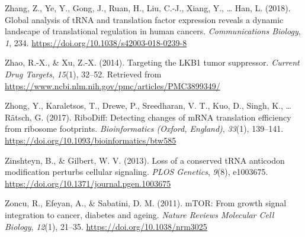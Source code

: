 \documentclass[12pt,openany]{book}
\begin{document}
\hypertarget{ref-Zhang2018}{}
Zhang, Z., Ye, Y., Gong, J., Ruan, H., Liu, C.-J., Xiang, Y., \ldots{}
Han, L. (2018). Global analysis of tRNA and translation factor
expression reveals a dynamic landscape of translational regulation in
human cancers. \emph{Communications Biology}, \emph{1}, 234.
\url{https://doi.org/10.1038/s42003-018-0239-8}

\hypertarget{ref-Zhao2014}{}
Zhao, R.-X., \& Xu, Z.-X. (2014). Targeting the LKB1 tumor suppressor.
\emph{Current Drug Targets}, \emph{15}(1), 32--52. Retrieved from
\url{https://www.ncbi.nlm.nih.gov/pmc/articles/PMC3899349/}

\hypertarget{ref-Zhong2017}{}
Zhong, Y., Karaletsos, T., Drewe, P., Sreedharan, V. T., Kuo, D., Singh,
K., \ldots{} Rätsch, G. (2017). RiboDiff: Detecting changes of mRNA
translation efficiency from ribosome footprints. \emph{Bioinformatics
(Oxford, England)}, \emph{33}(1), 139--141.
\url{https://doi.org/10.1093/bioinformatics/btw585}

\hypertarget{ref-Zinshteyn2013}{}
Zinshteyn, B., \& Gilbert, W. V. (2013). Loss of a conserved tRNA
anticodon modification perturbs cellular signaling. \emph{PLOS
Genetics}, \emph{9}(8), e1003675.
\url{https://doi.org/10.1371/journal.pgen.1003675}

\hypertarget{ref-Zoncu2011}{}
Zoncu, R., Efeyan, A., \& Sabatini, D. M. (2011). mTOR: From growth
signal integration to cancer, diabetes and ageing. \emph{Nature Reviews
Molecular Cell Biology}, \emph{12}(1), 21--35.
\url{https://doi.org/10.1038/nrm3025}
\end{document}
